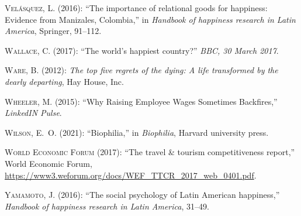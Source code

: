 \documentclass[10pt, letterpaper]{article}
\begin{document}
\begin{spacing}{2}
\begin{thebibliography}{120}
\textsc{Vel{\'a}squez, L.} (2016): \enquote{The importance of relational goods
  for happiness: Evidence from Manizales, Colombia,} in \emph{Handbook of
  happiness research in Latin America}, Springer, 91--112.

\textsc{Wallace, C.} (2017): \enquote{The world's happiest country?} \emph{BBC,
  30 March 2017}.

\textsc{Ware, B.} (2012): \emph{The top five regrets of the dying: A life
  transformed by the dearly departing}, Hay House, Inc.

\textsc{Wheeler, M.} (2015): \enquote{Why Raising Employee Wages Sometimes
  Backfires,} \emph{LinkedIN Pulse}.

\textsc{Wilson, E.~O.} (2021): \enquote{Biophilia,} in \emph{Biophilia},
  Harvard university press.

\textsc{{World Economic Forum}} (2017): \enquote{The travel \& tourism
  competitiveness report,} World Economic Forum,
  \url{https://www3.weforum.org/docs/WEF_TTCR_2017_web_0401.pdf}.

\textsc{Yamamoto, J.} (2016): \enquote{The social psychology of Latin American
  happiness,} \emph{Handbook of happiness research in Latin America}, 31--49.

\end{thebibliography}






\end{spacing}
\end{document}
